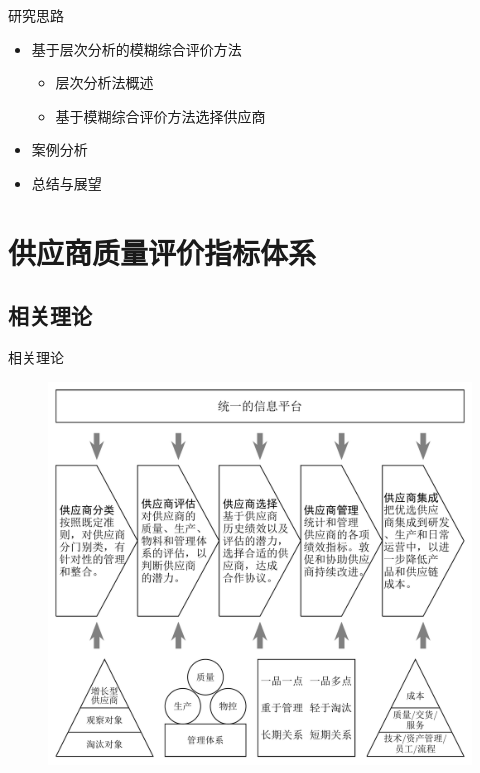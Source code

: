\documentclass{beamer}
\begin{document}
\begin{frame}{研究思路}
\begin{minipage}{0.38\linewidth}
{\begin{itemize}
\begin{itemize}
				\item 供应商综合评价指标体系
				\item 本章小结
			\end{itemize}
			\item 基于层次分析的模糊综合评价方法
				\begin{itemize}
				\scriptsize
				\item 层次分析法概述
				\item 基于模糊综合评价方法选择供应商 
			\end{itemize}
			\item 案例分析
			\item 总结与展望
		\end{itemize}}
	\end{minipage}
\end{frame}

\section{供应商质量评价指标体系}
\subsection{相关理论}
\begin{frame}{相关理论}
	\vspace{-3mm}
	\begin{figure}[h]
		\centering
		\includegraphics[height=0.9\textheight,trim=0 20 0 0,clip]{pic/供应商管理的流程.pdf}
	\end{figure}
\end{frame}
\end{document}
